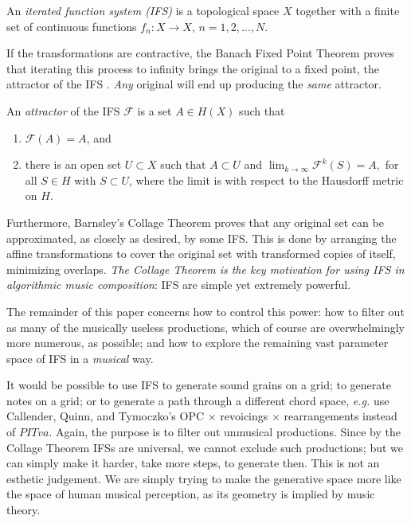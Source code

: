 \documentclass[english,11pt,letterpaper,onecolumn]{scrartcl}
\numberwithin{equation}{section}
\newcommand{\cF}{\mathcal{F}}
\begin{document}
    An \emph{iterated function system (IFS)} is a topological space $X$
    together with a finite set of continuous functions $f_{n}:X\rightarrow X$, 
    $n=1,2,\dots,N$.
    
    If the transformations are contractive, the Banach Fixed Point Theorem 
proves 
    that iterating this process to infinity brings the original to a fixed 
point, 
    the attractor of the IFS \cite{chaosandfractals, barnsley1985iterated, 
        10.2307/24893080, fractalseverywhere}. \textit{Any} original will end 
up 
    producing the \textit{same} attractor. 
    
    An \emph{attractor} of the IFS $\mathcal{F}$ is a set
    $A\in H(X)$ such that
    
    \begin{enumerate}
        \item $\cF(A)=A$, and
        
        \item there is an open set $U\subset X$ such that $A\subset U$ and
        $\lim_{k\rightarrow\infty}\cF^{k}(S)=A,$ for all $S\in H$ with 
$S\subset U$,
        where the limit is with respect to the Hausdorff metric on $H$.
    \end{enumerate}
    
    
    Furthermore, Barnsley's Collage Theorem \cite{barnsley:1986:solution} 
proves 
    that any original set can be approximated, as closely as desired, by some 
IFS. 
    This is done by arranging the affine transformations to cover the original 
set 
    with transformed copies of itself, minimizing overlaps. \textit{The 
Collage 
        Theorem is the key motivation for using IFS in algorithmic music 
composition}: 
    IFS are simple yet extremely powerful. 
    
    The remainder of this paper concerns how to control this power: how to 
    filter out as many of the musically useless productions, which of course 
are 
    overwhelmingly more numerous, as possible; and how to explore the 
    remaining vast parameter space of IFS in a \textit{musical} way.
    
    It would be possible to use IFS to generate sound grains on a grid; to 
    generate notes on a grid; or to generate a path through a different chord 
    space, \textit{e.g.} use Callender, Quinn, and Tymoczko's OPC $\times$ 
    revoicings 
    $\times$ rearrangements instead of $PITva$. Again, the purpose is to 
filter 
    out unmusical productions. Since by the Collage Theorem IFSs are universal, 
we 
    cannot exclude such productions; but we can simply make it harder, take 
more 
    steps, to generate then. This is not an esthetic judgement. We are 
    simply trying to make the generative space more like the space of human 
    musical perception, as its geometry is implied by music theory.
    
\end{document}
